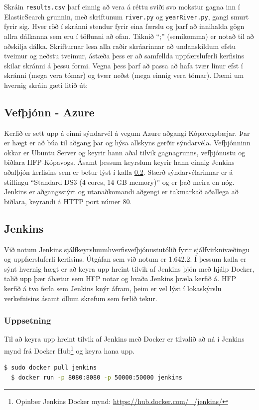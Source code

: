 \documentclass{article}
\theoremstyle{blueP}
\theoremstyle{greenS}
\begin{document}
Skráin \lstinline{results.csv} þarf einnig að vera á réttu sviði svo mokstur gagna inn í ElasticSearch grunnin, með skriftunum \lstinline{river.py} og \lstinline{yearRiver.py}, gangi smurt fyrir sig. Hver röð í skránni stendur fyrir eina færslu og þarf að innihalda gögn allra dálkanna sem eru í töflunni að ofan. Táknið ``;'' (semíkomma) er notað til að aðskilja dálka. Skrifturnar lesa alla raðir skráarinnar að undanskildum efstu tveimur og neðstu tveimur, ástæða þess er að samfellda uppfærsluferli kerfisins skilar skránni á þessu formi. Vegna þess þarf að passa að hafa tvær línur efst í skránni (mega vera tómar) og tvær neðst (mega einnig vera tómar). Dæmi um hvernig skráin gæti litið út:

\subsection{Vefþjónn - Azure}
Kerfið er sett upp á einni sýndarvél á vegum Azure aðgangi Kópavogsbæjar. Þar er hægt er að búa til aðgang þar og hýsa allskyns gerðir sýndarvéla. Vefþjónninn okkar er Ubuntu Server og keyrir hann aðal tilvik gagnagrunns, vefþjónustu og biðlara HFP-Kópavogs. Ásamt þessum keyrslum keyrir hann einnig Jenkins aðalþjón kerfisins sem er betur lýst í kafla \ref{chapter:jenkins}. Stærð sýndarvélarinnar er á stillingu ``Standard DS3 (4 cores, 14 GB memory)'' og er það meira en nóg. Jenkins er aðgangsstýrt og utanaðkomandi aðgengi er takmarkað aðallega að biðlara, keyrandi á HTTP port númer 80.

\subsection{Jenkins}
\label{chapter:jenkins}
Við notum Jenkins sjálfkeyrsluumhverfisvefþjónustutólið fyrir sjálfvirknivæðingu og uppfærsluferli kerfisins. Útgáfan sem við notum er 1.642.2. Í þessum kafla er sýnt hvernig hægt er að keyra upp hreint tilvik af Jenkins þjón með hjálp Docker, talið upp þær ábætur sem HFP notar og hvaða Jenkins þræla kerfið á. HFP kerfið á tvo ferla sem Jenkins knýr áfram, þeim er vel lýst í lokaskýrslu verkefnisins ásamt öllum skrefum sem ferlið tekur.

\subsubsection{Uppsetning}
Til að keyra upp hreint tilvik af Jenkins með Docker er tilvalið að ná í Jenkins mynd frá Docker Hub\footnote{Opinber Jenkins Docker mynd: \url{https://hub.docker.com/_/jenkins/}} og keyra hana upp.
\begin{lstlisting}[language=bash]
  $ sudo docker pull jenkins
  $ docker run -p 8080:8080 -p 50000:50000 jenkins
\end{lstlisting}
\end{document}
